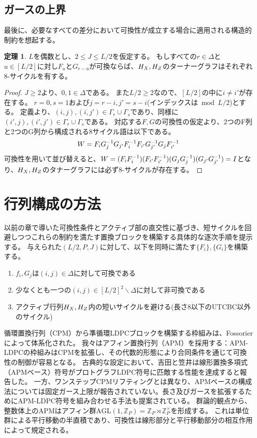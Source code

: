 \documentclass[a4paper,11pt,dvipdfmx]{jsarticle}
\theoremstyle{definition}
\newtheorem{theorem}[definition]{定理}
\begin{document}
\subsection{ガースの上界}
最後に、必要なすべての差分において可換性が成立する場合に適用される構造的制約を想起する。
\begin{theorem}
  $L$を偶数とし、$2\leq J\leq L/2$を仮定する。
  もしすべての$r\in\Delta$と$u\in[L/2]$に対し$F_u$と$G_{r-u}$が可換ならば、$H_X,H_Z$のターナーグラフはそれぞれ8-サイクルを有する。
\end{theorem}
\begin{proof}
  $J\geq 2$より、$0,1\in\Delta$である。
  また$L/2\geq 2$なので、$[L/2]$の中に$i\neq i'$が存在する。
  $r=0,s=1$および$j=r-i,j'=s-i$(インデックスは$\bmod L/2$)とする。
  定義より、$(i,j),(i,j')\in\Gamma_r\cup\Gamma_s$であり、同様に$(i',j),(i',j')\in\Gamma_r\cup\Gamma_s$である。
  対応する$F,G$の可換性の仮定より、2つのF列と2つのG列から構成される8サイクル語は以下である。
  \begin{align}
    W=F_{i}G_j^{-1} G_{j'}F_i^{-1} F_{i'}G_{j'}^{-1} G_jF_{i'}^{-1}\label{eq:01201453}
  \end{align}
  可換性を用いて並び替えると、$W=(F_iF_i^{-1})(F_{i'}F_{i'}^{-1})(G_jG_j^{-1})(G_{j'}G_{j'}^{-1})=I$となり、$H_X,H_Z$のタナーグラフには必ず8-サイクルが存在する。

\end{proof}

\section{行列構成の方法}
以前の章で導いた可換性条件とアクティブ部の直交性に基づき、短サイクルを回避しつつこれらの制約を満たす置換ブロックを構築する具体的な逐次手順を提示する。
与えられた$(L/2,P,J)$に対して、以下を同時に満たす$\{F_i\},\{G_i\}$を構築する。
\begin{enumerate}
  \item $f_i,G_j$は$(i,j)\in\Delta$に対して可換である
  \item 少なくとも一つの$(i,j)\in[L/2]^2\backslash\Delta$に対して非可換である
  \item アクティブ行列$H_X,H_Z$内の短いサイクルを避ける(長さ8以下のUTCBC以外のサイクル)
\end{enumerate}

循環置換行列（CPM）から準循環LDPCブロックを構築する枠組みは、Fossorierによって体系化された。
我々はアフィン置換行列（APM）を採用する：APM-LDPCの枠組みはCPMを拡張し、その代数的形態により合同条件を通じて可換性の制御が容易となる。
古典的な設定において、吉田と笠井は線形置換多項式（APMベース）符号がプロトグラフLDPC符号に匹敵する性能を達成すると報告した。
一方、ワンステップCPMリフティングとは異なり、APMベースの構成法については固定ガース上限が報告されていない。長さ及びガースを拡張するためにAPM-LDPC符号を組み合わせる手法も提案されている。
群論的観点から、整数体上のAPMはアフィン群$\text{AGL}(1, \mathbb{Z}_P) = \mathbb{Z}_P\rtimes \mathbb{Z}_P^\times $を形成する。
これは単位群による平行移動の半直積であり、可換性は線形部分と平行移動部分の相互作用によって規定される。
\end{document}
